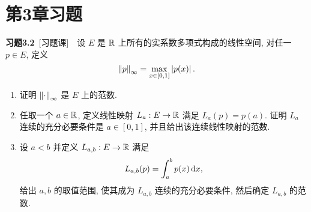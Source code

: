 \section{第3章习题}

	\textbf{习题3.2}\ [习题课]\ \ 设 $ E $ 是 $ \mathbb{R} $ 上所有的实系数多项式构成的线性空间, 对任一 $ p\in E $, 定义
	\[
		\left\| p \right\|_{\infty}=\max_{x\in[0, 1]}\left| p(x) \right| .
	\]
	\begin{enumerate}[(1)]
		\item 证明 $ \left\| \cdot \right\|_{\infty} $ 是 $ E $ 上的范数.
		\item 任取一个 $ a\in\mathbb{R} $, 定义线性映射 $ L_{a}:E\to \mathbb{R} $ 满足 $ L_{a}(p)=p(a) $. 证明 $ L_{a} $ 连续的充分必要条件是 $ a\in[0, 1] $, 并且给出该连续线性映射的范数.
		\item 设 $ a<b $ 并定义 $ L_{a, b}:E\to \mathbb{R} $ 满足
		\[
			L_{a, b}(p)=\int_{a}^{b}p(x)\,\mathrm{d} x,
		\]
		给出 $ a, b $ 的取值范围, 使其成为 $ L_{a, b} $ 连续的充分必要条件, 然后确定 $ L_{a, b} $ 的范数.
	\end{enumerate}

